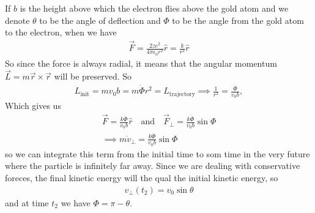 If $b$ is the height above which the electron flies above the gold atom and we denote $\theta$ to be the angle of deflection and $\Phi$ to be the angle from the gold atom to the electron, when we have
\begin{align*}
	\vec{F} = \frac{2ze^2}{4 \pi \epsilon_0 r^2} \hat{r} = \frac{k}{r^2}\hat{r}
\end{align*}
So since the force is always radial, it means that the angular momentum $\vec{L} = m \vec{r} \times \vec{r}$ will be preserved. So
\begin{align*}
	L_{\text{init}} = mv_0 b = m \dot{\Phi}r^2 = L_{\text{trajectory}} \implies \frac{1}{r^2} = \frac{\dot{\Phi}}{v_0b},
\end{align*}
Which gives us
\begin{align*}
	\vec{F} = \frac{k \dot{\Phi}}{v_0 b}\hat{r} \quad \text{and} \quad \vec{F}_{\bot} = \frac{k \dot{\Phi}}{v_0 b} \sin \Phi\\
	\implies m \dot{v}_{\bot} = \frac{k \dot{\Phi}}{v_0 b} \sin \Phi
\end{align*}
so we can integrate this term from the initial time to som time in the very future where the particle is infinitely far away. 
Since we are dealing with conservative foreces, the final kinetic energy will the qual the initial kinetic energy, so
\begin{align*}
	v_{\bot}(t_2) =  v_0 \sin \theta
\end{align*}
and at time $t_2$ we have $\Phi = \pi - \theta$.
